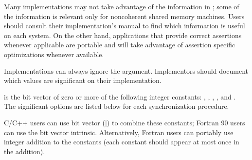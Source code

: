 \begin{users}
Many implementations may not take advantage of the information in
; some of the information is relevant only for
noncoherent shared memory machines.  Users
should consult their implementation's manual 
to
find which information is useful on each system. On the other hand,
applications that provide correct
assertions whenever applicable are portable and will
take advantage of assertion specific optimizations whenever available.
\end{users}

\begin{implementors}
Implementations can always ignore the  argument.
Implementors should
document which  values are significant on their
implementation.
\end{implementors}

 is the bit vector  of zero or more of the following
integer constants:
, ,
,
, and .
The significant options are listed below for each synchronization procedure.

\begin{users}
C/C++ users can use bit vector  ($\mid$) to combine these constants;
Fortran 90 users
can use the bit vector  intrinsic.
Alternatively, Fortran users can
portably use integer addition to  the constants (each constant should
appear at most once in the addition).
\end{users}

